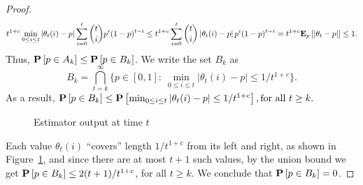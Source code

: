 \begin{proof}
\[    t^{1 + c} \min_{0 \leq i \leq t} \left| \theta_t(i) - p \right|
    \sum_{i=0}^t \binom{t}{i} p^i (1-p)^{t-i}
    \leq
    t^{1 + c} \sum_{i=0}^t \binom{t}{i} \left| \theta_t(i) - p \right| p^i (1-p)^{t-i}
    = t^{1+c} \bm{\mathrm{E}}_{p} \left[ |\theta_t  - p | \right]
    \leq
    1.
  \]
  Thus, $\bm{\mathrm{P}}\left[p \in A_k\right] \leq \bm{\mathrm{P}}\left[p \in B_k\right]$.
  We write the set $B_k$ as
  \[
    B_k = \bigcap_{t=k}^{\infty}\{p \in [0,1]:~ \min_{0 \leq
      i \leq t} |\theta_t(i)-p|\leq 1/t^{1+c}
    \}.
  \]
  As a result,
  \(
    \bm{\mathrm{P}}\left[p \in B_k\right]
    \leq \bm{\mathrm{P}}\left[\min_{0 \leq i \leq t}|\theta_t(i)-p| \leq 1/t^{1+c} \right],
    \text{for all } t \geq k.
  \)
  \begin{figure}
    \centering
    \caption{Estimator output at time $t$} \label{fig:estimator}
  \end{figure}
  Each value $\theta_t(i)$ \enquote{covers} length $1/t^{1+c}$ from
  its left and right, as shown in Figure~\ref{fig:estimator},
  and since there are at most $t+1$ such values,
  by the union bound we get
  $\bm{\mathrm{P}}\left[p \in B_k\right] \leq 2(t+1)/t^{1+c}$, for all $t \geq k$.
  We conclude that $\bm{\mathrm{P}}\left[p \in B_k\right] =0$.
\end{proof}

